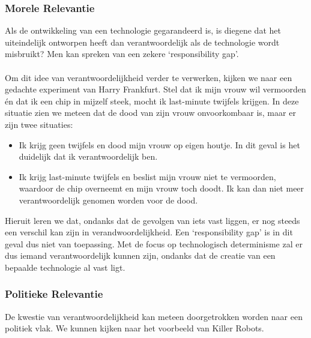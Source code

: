 \documentclass[../summary.tex]{subfiles}
\begin{document}
	\subsubsection{Morele Relevantie}
	Als de ontwikkeling van een technologie gegarandeerd is, is diegene dat het uiteindelijk ontworpen heeft dan verantwoordelijk als de technologie wordt misbruikt? Men kan spreken van een zekere `responsibility gap'. \\
	\\
	Om dit idee van verantwoordelijkheid verder te verwerken, kijken we naar een gedachte experiment van Harry Frankfurt. Stel dat ik mijn vrouw wil vermoorden én dat ik een chip in mijzelf steek, mocht ik last-minute twijfels krijgen. In deze situatie zien we meteen dat de dood van zijn vrouw onvoorkombaar is, maar er zijn twee situaties:
	\begin{itemize}
		\item Ik krijg geen twijfels en dood mijn vrouw op eigen houtje. In dit geval is het duidelijk dat ik verantwoordelijk ben.
		\item Ik krijg last-minute twijfels en beslist mijn vrouw niet te vermoorden, waardoor de chip overneemt en mijn vrouw toch doodt. Ik kan dan niet meer verantwoordelijk genomen worden voor de dood.
	\end{itemize}
	Hieruit leren we dat, ondanks dat de gevolgen van iets vast liggen, er nog steeds een verschil kan zijn in verandwoordelijkheid. Een `responsibility gap' is in dit geval dus niet van toepassing. Met de focus op technologisch determinisme zal er dus iemand verantwoordelijk kunnen zijn, ondanks dat de creatie van een bepaalde technologie al vast ligt.
	
	\subsubsection{Politieke Relevantie}
	 De kwestie van verantwoordelijkheid kan meteen doorgetrokken worden naar een politiek vlak. We kunnen kijken naar het voorbeeld van Killer Robots.
	
\end{document}
